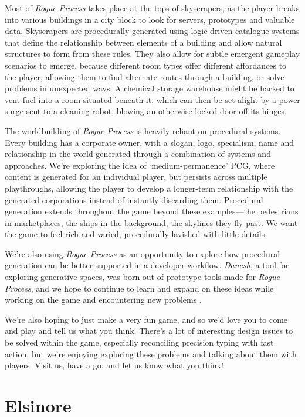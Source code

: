 \documentclass[letterpaper]{article}
\begin{document}
Most of \textit{Rogue Process} takes place at the tops of skyscrapers, as the player breaks into various buildings in a city block to look for servers, prototypes and valuable data.
Skyscrapers are procedurally generated using logic-driven catalogue systems that define the relationship between elements of a building and allow natural structures to form from these rules.
They also allow for subtle emergent gameplay scenarios to emerge, because different room types offer different affordances to the player, allowing them to find alternate routes through a building, or solve problems in unexpected ways.
A chemical storage warehouse might be hacked to vent fuel into a room situated beneath it, which can then be set alight by a power surge sent to a cleaning robot, blowing an otherwise locked door off its hinges.

The worldbuilding of \textit{Rogue Process} is heavily reliant on procedural systems.
Every building has a corporate owner, with a slogan, logo, specialism, name and relationship in the world generated through a combination of systems and approaches.
We're exploring the idea of `medium-permanence' PCG, where content is generated for an individual player, but persists across multiple playthroughs, allowing the player to develop a longer-term relationship with the generated corporations instead of instantly discarding them.
Procedural generation extends throughout the game beyond these examples---the pedestrians in marketplaces, the ships in the background, the skylines they fly past.
We want the game to feel rich and varied, procedurally lavished with little details.

We're also using \textit{Rogue Process} as an opportunity to explore how procedural generation can be better supported in a developer workflow.
\textit{Danesh}, a tool for exploring generative spaces, was born out of prototype tools made for \textit{Rogue Process}, and we hope to continue to learn and expand on these ideas while working on the game and encountering new problems \cite{cook2016:danesh}.

We're also hoping to just make a very fun game, and so we'd love you to come and play and tell us what you think.
There's a lot of interesting design issues to be solved within the game, especially reconciling precision typing with fast action, but we're enjoying exploring these problems and talking about them with players.
Visit us, have a go, and let us know what you think!



\section{Elsinore}
\end{document}
